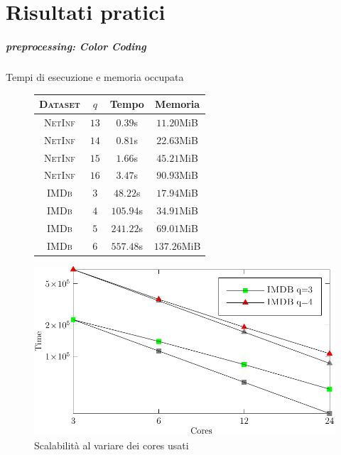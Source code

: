 \part{Risultati pratici}

\begin{frame}
	\partpage
	\centering
\end{frame}

\begin{frame}
	\frametitle{preprocessing: Color Coding}
	\centering
	\Large
	Tempi di esecuzione e memoria occupata
	
	\small
	\begin{figure}[h]
		\centering
		\begin{minipage}[ht]{.49\textwidth}
			\centering
			\begin{table}
				\centering
				\begin{tabular}{|c|c|c|c|}
					\hline
					\textsc{Dataset} & $q$  &               Tempo & Memoria \\ \hline \hline
					\textsc{NetInf}  & $13$ & \phantom{11}$0.39$s & \phantom{1}$11.20$MiB     \\ \hline
					\textsc{NetInf}  & $14$ & \phantom{11}$0.81$s & \phantom{1}$22.63$MiB     \\ \hline
					\textsc{NetInf}  & $15$ & \phantom{11}$1.66$s & \phantom{1}$45.21$MiB     \\ \hline
					\textsc{NetInf}  & $16$ & \phantom{11}$3.47$s & \phantom{1}$90.93$MiB     \\ \hline \hline
					\textsc{IMDb}    & $3$  & \phantom{1}$48.22$s & \phantom{1}$17.94$MiB     \\ \hline
					\textsc{IMDb}    & $4$  &           $105.94$s & \phantom{1}$34.91$MiB     \\ \hline
					\textsc{IMDb}    & $5$  &           $241.22$s & \phantom{1}$69.01$MiB     \\ \hline
					\textsc{IMDb}    & $6$  &           $557.48$s & $137.26$MiB     \\ \hline
				\end{tabular}
			\end{table}
		\end{minipage}
		\begin{minipage}[ht]{.49\textwidth}
			\centering
			\includegraphics[width=.9\textwidth]{images/3_color_coding}
			\caption{Scalabilità al variare dei cores usati}
		\end{minipage}
	\end{figure}
	

\end{frame}
